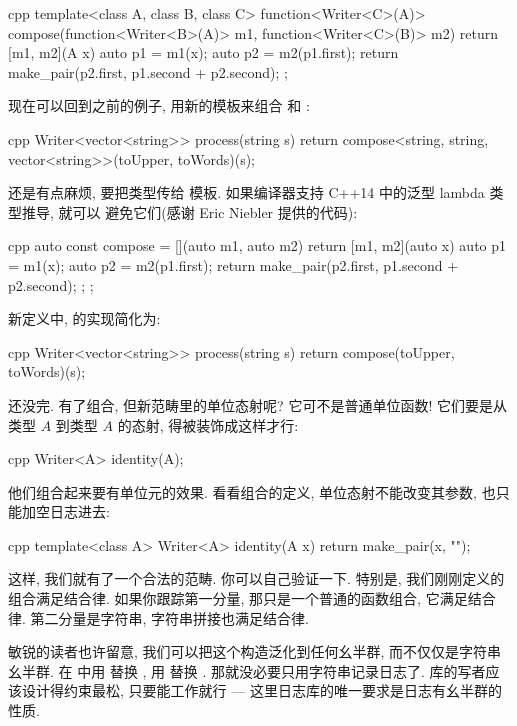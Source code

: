 \begin{snip}{cpp}
template<class A, class B, class C>
function<Writer<C>(A)> compose(function<Writer<B>(A)> m1,
                               function<Writer<C>(B)> m2)
{
    return [m1, m2](A x) {
        auto p1 = m1(x);
        auto p2 = m2(p1.first);
        return make_pair(p2.first, p1.second + p2.second);
    };
}
\end{snip}
现在可以回到之前的例子, 用新的模板来组合  和 :

\begin{snip}{cpp}
Writer<vector<string>> process(string s) {
    return compose<string, string, vector<string>>(toUpper, toWords)(s);
}
\end{snip}
还是有点麻烦, 要把类型传给  模板. 如果编译器支持 C++14 中的泛型 lambda 类型推导, 就可以
避免它们(感谢 Eric Niebler 提供的代码):

\begin{snip}{cpp}
auto const compose = [](auto m1, auto m2) {
    return [m1, m2](auto x) {
        auto p1 = m1(x);
        auto p2 = m2(p1.first);
        return make_pair(p2.first, p1.second + p2.second);
    };
};
\end{snip}
新定义中,  的实现简化为:

\begin{snip}{cpp}
Writer<vector<string>> process(string s) {
    return compose(toUpper, toWords)(s);
}
\end{snip}
还没完. 有了组合, 但新范畴里的单位态射呢? 它可不是普通单位函数! 它们要是从类型 $A$ 到类型 $A$ 的态射,
得被装饰成这样才行:

\begin{snip}{cpp}
Writer<A> identity(A);
\end{snip}
他们组合起来要有单位元的效果. 看看组合的定义, 单位态射不能改变其参数, 也只能加空日志进去:

\begin{snip}{cpp}
template<class A> Writer<A> identity(A x) {
    return make_pair(x, "");
}
\end{snip}
这样, 我们就有了一个合法的范畴. 你可以自己验证一下. 特别是, 我们刚刚定义的组合满足结合律. 如果你跟踪第一分量,
那只是一个普通的函数组合, 它满足结合律. 第二分量是字符串, 字符串拼接也满足结合律.

敏锐的读者也许留意, 我们可以把这个构造泛化到任何幺半群, 而不仅仅是字符串幺半群. 在  中用
 替换 \code{+}, 用  替换 . 那就没必要只用字符串记录日志了.
库的写者应该设计得约束最松, 只要能工作就行 --- 这里日志库的唯一要求是日志有幺半群的性质.

